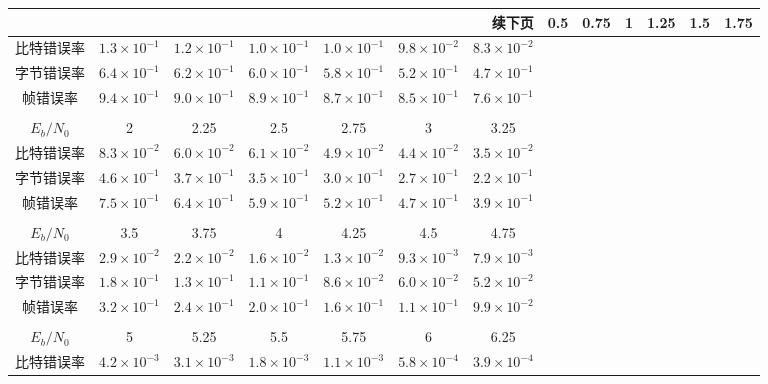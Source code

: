 \begin{longtable}{|c||c|c|c|c|c|c|}
\hline
\multicolumn{7}{r}{续下页}
\endfoot
\endlastfoot
\hline
    $E_b/N_0$&0.5&0.75&1&1.25&1.5&1.75\\
\hline
\hline
    比特错误率&$1.3\times 10^{-1}$&$1.2\times 10^{-1}$&$1.0\times
    10^{-1}$&$1.0\times 10^{-1}$&$9.8\times 10^{-2}$&$8.3\times
    10^{-2}$\\
\hline
    字节错误率&$6.4\times 10^{-1}$&$6.2\times 10^{-1}$&$6.0\times
    10^{-1}$&$5.8\times 10^{-1}$&$5.2\times 10^{-1}$&$4.7\times
    10^{-1}$\\
\hline
    帧错误率&$9.4\times 10^{-1}$&$9.0\times 10^{-1}$&$8.9\times
    10^{-1}$&$8.7\times 10^{-1}$&$8.5\times 10^{-1}$&$7.6\times
    10^{-1}$\\
\hline
\multicolumn{7}{c}{\vspace{2pt}}\\
\hline
 $E_b/N_0$&2&2.25&2.5&2.75&3&3.25\\
 \hline
 \hline
 比特错误率&$8.3\times 10^{-2}$&$6.0\times 10^{-2}$&$6.1\times 10^{-2}$&$4.9\times 10^{-2}$&$4.4\times
    10^{-2}$&$3.5\times 10^{-2}$\\
\hline
 字节错误率&$4.6\times 10^{-1}$&$3.7\times 10^{-1}$&$3.5\times 10^{-1}$&$3.0\times 10^{-1}$&$2.7\times
    10^{-1}$&$2.2\times 10^{-1}$\\
\hline
帧错误率&$7.5\times 10^{-1}$&$6.4\times 10^{-1}$&$5.9\times 10^{-1}$&$5.2\times 10^{-1}$&$4.7\times
    10^{-1}$&$3.9\times 10^{-1}$\\
\hline
\multicolumn{7}{c}{\vspace{2pt}}\\
\hline
$E_b/N_0$&3.5&3.75&4&4.25&4.5&4.75\\
\hline
\hline
比特错误率&$2.9\times 10^{-2}$&$2.2\times
    10^{-2}$&$1.6\times 10^{-2}$&$1.3\times 10^{-2}$&$9.3\times 10^{-3}$&$7.9\times 10^{-3}$\\
\hline
字节错误率&$1.8\times 10^{-1}$&$1.3\times
    10^{-1}$&$1.1\times 10^{-1}$&$8.6\times 10^{-2}$&$6.0\times 10^{-2}$&$5.2\times 10^{-2}$\\
\hline
帧错误率&$3.2\times 10^{-1}$&$2.4\times
    10^{-1}$&$2.0\times 10^{-1}$&$1.6\times 10^{-1}$&$1.1\times 10^{-1}$&$9.9\times 10^{-2}$\\
\hline
\multicolumn{7}{c}{\vspace{2pt}}\\
\hline
$E_b/N_0$&5&5.25&5.5&5.75&6&6.25\\
\hline
\hline
比特错误率&$4.2\times
    10^{-3}$&$3.1\times 10^{-3}$&$1.8\times 10^{-3}$&$1.1\times
    10^{-3}$&$5.8\times 10^{-4}$&$3.9\times 10^{-4}$\\

\end{longtable}
